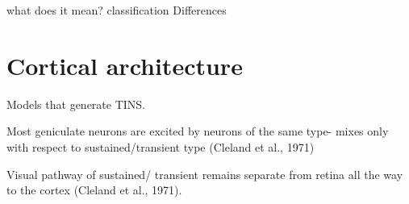what does it mean?
classification
Differences

\section{Cortical architecture}

Models that generate
TINS.


Most geniculate neurons are excited by neurons of the same type- mixes only with respect to sustained/transient type (Cleland et al., 1971)

Visual pathway of sustained/ transient remains separate from retina all the way to the cortex (Cleland et al., 1971).

